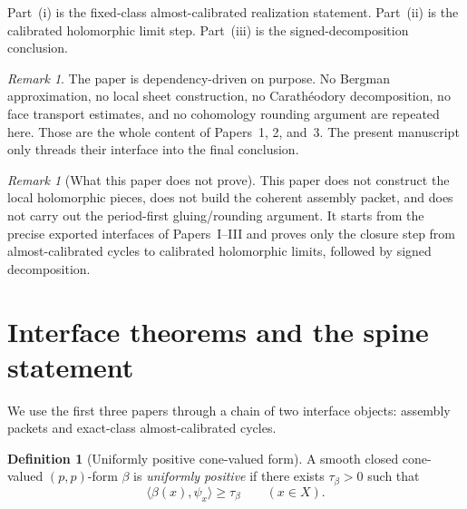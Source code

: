 \documentclass[11pt]{article}
\numberwithin{equation}{section}
\theoremstyle{plain}
\theoremstyle{definition}
\newtheorem{definition}[theorem]{Definition}
\theoremstyle{remark}
\newtheorem{remark}[theorem]{Remark}
\begin{document}
Part~\textnormal{(i)} is the fixed-class almost-calibrated realization statement. Part~\textnormal{(ii)} is the calibrated holomorphic limit step. Part~\textnormal{(iii)} is the signed-decomposition conclusion.

\begin{remark}
The paper is dependency-driven on purpose. No Bergman approximation, no local sheet construction, no Carath\'eodory decomposition, no face transport estimates, and no cohomology rounding argument are repeated here. Those are the whole content of Papers~1, 2, and~3. The present manuscript only threads their interface into the final conclusion.
\end{remark}

\begin{remark}[What this paper does not prove]
This paper does not construct the local holomorphic pieces, does not build the coherent assembly packet, and does not carry out the period-first gluing/rounding argument. It starts from the precise exported interfaces of Papers~I--III and proves only the closure step from almost-calibrated cycles to calibrated holomorphic limits, followed by signed decomposition.
\end{remark}

\section{Interface theorems and the spine statement}\label{sec:interface}

We use the first three papers through a chain of two interface objects: assembly packets and exact-class almost-calibrated cycles.

\begin{definition}[Uniformly positive cone-valued form]
A smooth closed cone-valued $(p,p)$-form $\beta$ is \emph{uniformly positive} if there exists $\tau_\beta>0$ such that
\[
\langle\beta(x),\psi_x\rangle\ge \tau_\beta
\qquad (x\in X).
\]
\end{definition}
\end{document}
